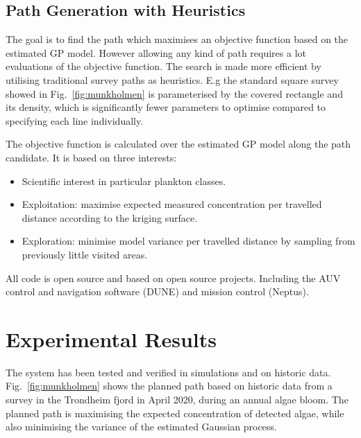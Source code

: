 \documentclass[conference]{IEEEtran}
\newcommand{\cmt}[1]{{\color{red}{#1}}}
\begin{document}
\subsection{Path Generation with Heuristics}
The goal is to find the path which maximises an objective function
based on the estimated GP model.
However allowing any kind
of path requires a lot evaluations of the objective function. The
search is made more efficient by utilising traditional survey paths as
heuristics. E.g the standard square survey showed in
Fig.~\ref{fig:munkholmen} is parameterised by the covered rectangle
and its density, which is significantly fewer parameters to optimise
compared to specifying each line individually.

The objective function is calculated over the estimated GP model along
the path candidate. It is based on three interests:

\begin{itemize}
    \item Scientific interest in particular plankton classes. 
    \item Exploitation: maximise expected measured concentration per travelled distance
      according to the kriging surface. 
    \item Exploration: minimise model variance per travelled distance by sampling from
      previously little visited areas.
\end{itemize}
All code is open source and based on open source projects. Including
the AUV control and navigation software (DUNE) and mission control
(Neptus)\cite{pinto2013lsts}.

\section{Experimental Results}

The system has been tested and verified in simulations and on historic
data. Fig.~\ref{fig:munkholmen} shows the planned path based on historic
data from a survey in the Trondheim fjord in April 2020, during an
annual algae bloom. The planned path is maximising the expected
concentration of detected algae, while also minimising the variance of
the estimated Gaussian process.
\end{document}
